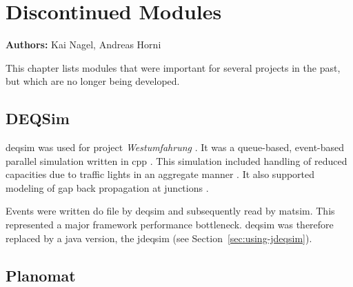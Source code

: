 \chapter{Discontinued Modules}
\label{ch:discontinued}

\hfill \textbf{Authors:} Kai Nagel, Andreas Horni



This chapter lists modules that were important for several projects in the past, but which are no longer being developed.

\section{DEQSim}
\label{sec:deqsim}
\gls{deqsim} was used for project \emph{Westumfahrung} \citep[][]{BalmerEtAl_ResRep_bdktzrh_2009}. It was a queue-based, event-based parallel simulation written in \gls{cpp} \citep[][]{CharyparAxhausenEtAl2007Event-DrivenQueueBasedTraffic,Charypar_PhDThesis_2008}. This simulation included handling of reduced capacities due to traffic lights in an aggregate manner \citep[][p.139 ff]{Charypar_PhDThesis_2008}. It also supported modeling of gap back propagation at junctions \citep[][p.98 ff]{Charypar_PhDThesis_2008}.

Events were written do file by \gls{deqsim} and subsequently read by \gls{matsim}.  This represented a major framework performance bottleneck. \Gls{deqsim} was therefore replaced by a \gls{java} version, the \gls{jdeqsim} (see Section~\ref{sec:using-jdeqsim}).

\section{Planomat}
\label{sec:planomat}

